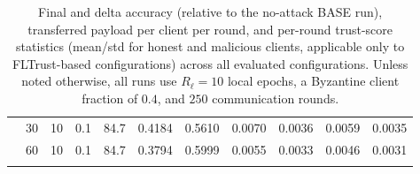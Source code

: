 \begin{longtable}{@{}l c c c c c c c c c c@{}}
	& 30 & 10 & 0.1 & 84.7 & 0.4184 & 0.5610 & 0.0070 & 0.0036 & 0.0059 & 0.0035 \\
	& 60 & 10 & 0.1 & 84.7 & 0.3794 & 0.5999 & 0.0055 & 0.0033 & 0.0046 & 0.0031 \\
	\caption{Final and delta accuracy (relative to the no-attack BASE run), transferred payload per client per round, and per-round trust-score statistics (mean/std for honest and malicious clients, applicable only to FLTrust-based configurations) across all evaluated configurations. Unless noted otherwise, all runs use $R_\ell=10$ local epochs, a Byzantine client fraction of $0.4$, and $250$ communication rounds.}
	\label{tab:accuracy-summary}
\end{longtable}
